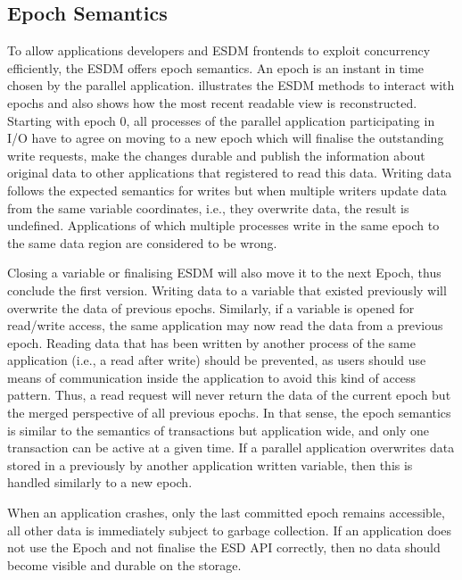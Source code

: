 \subsection{Epoch Semantics}
\label{sec: viewpoints/logical/data model/epochs}

To allow applications developers and ESDM frontends to exploit concurrency efficiently, the ESDM offers epoch semantics.
An epoch is an instant in time chosen by the parallel application.
 illustrates the ESDM methods to interact with epochs and also shows how the most recent readable view is reconstructed.
Starting with epoch 0, all processes of the parallel application participating in I/O have to agree on moving to a new epoch which will finalise the outstanding write requests, make the changes durable and publish the information about original data to other applications that registered to read this data.
Writing data follows the expected semantics for writes but when multiple writers update data from the same variable coordinates, i.e., they overwrite data, the result is undefined.
Applications of which multiple processes write in the same epoch to the same data region are considered to be wrong.

Closing a variable or finalising ESDM will also move it to the next Epoch, thus conclude the first version.
Writing data to a variable that existed previously will overwrite the data of previous epochs.
Similarly, if a variable is opened for read/write access, the same application may now read the data from a previous epoch.
Reading data that has been written by another process of the same application (i.e., a read after write) should be prevented, as users should use means of communication inside the application to avoid this kind of access pattern.
Thus, a read request will never return the data of the current epoch but the merged perspective of all previous epochs.
In that sense, the epoch semantics is similar to the semantics of transactions but application wide, and only one transaction can be active at a given time.
If a parallel application overwrites data stored in a previously by another application written variable, then this is handled similarly to a new epoch.

When an application crashes, only the last committed epoch remains accessible, all other data is immediately subject to garbage collection.
If an application does not use the Epoch and not finalise the ESD API correctly, then no data should become visible and durable on the storage.





